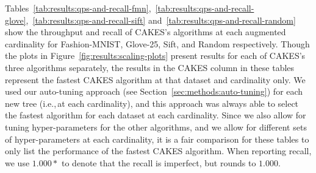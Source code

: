 Tables~\ref{tab:results:qps-and-recall-fmn},~\ref{tab:results:qps-and-recall-glove},~\ref{tab:results:qps-and-recall-sift} and~\ref{tab:results:qps-and-recall-random} show the throughput and recall of CAKES's algorithms at each augmented cardinality for Fashion-MNIST, Glove-25, Sift, and Random respectively.
Though the plots in Figure~\ref{fig:results:scaling-plots} present results for each of CAKES's three algorithms separately, the results in the CAKES column in these tables represent the fastest CAKES algorithm at that dataset and cardinality only.
We used our auto-tuning approach (see Section~\ref{sec:methods:auto-tuning}) for each new tree (i.e.,\,at each cardinality), and this approach was always able to select the fastest algorithm for each dataset at each cardinality.
Since we also allow for tuning hyper-parameters for the other algorithms, and we allow for different sets of hyper-parameters at each cardinality, it is a fair comparison for these tables to only list the performance of the fastest CAKES algorithm.
When reporting recall, we use $1.000*$ to denote that the recall is imperfect, but rounds to $1.000$.








